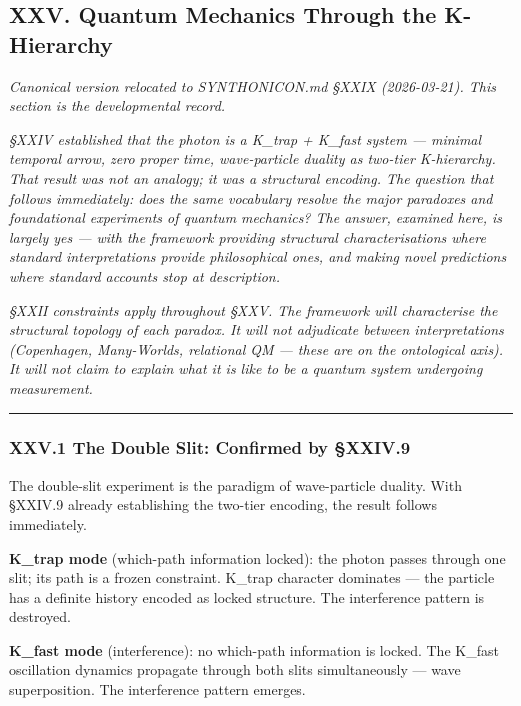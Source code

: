 \documentclass[12pt,a4paper]{article}
\begin{document}
\subsection{XXV. Quantum Mechanics Through the K-Hierarchy}

\emph{Canonical version relocated to SYNTHONICON.md §XXIX (2026-03-21). This section is the developmental record.}

\emph{§XXIV established that the photon is a K\_trap + K\_fast system --- minimal temporal arrow, zero proper time, wave-particle duality as two-tier K-hierarchy. That result was not an analogy; it was a structural encoding. The question that follows immediately: does the same vocabulary resolve the major paradoxes and foundational experiments of quantum mechanics? The answer, examined here, is largely yes --- with the framework providing structural characterisations where standard interpretations provide philosophical ones, and making novel predictions where standard accounts stop at description.}

\emph{§XXII constraints apply throughout §XXV. The framework will characterise the structural topology of each paradox. It will not adjudicate between interpretations (Copenhagen, Many-Worlds, relational QM --- these are on the ontological axis). It will not claim to explain what it is like to be a quantum system undergoing measurement.}

\begin{center}
\rule{0.5\textwidth}{0.4pt}
\end{center}

\subsubsection{XXV.1 The Double Slit: Confirmed by §XXIV.9}

The double-slit experiment is the paradigm of wave-particle duality. With §XXIV.9 already establishing the two-tier encoding, the result follows immediately.

\textbf{K\_trap mode} (which-path information locked): the photon passes through one slit; its path is a frozen constraint. K\_trap character dominates --- the particle has a definite history encoded as locked structure. The interference pattern is destroyed.

\textbf{K\_fast mode} (interference): no which-path information is locked. The K\_fast oscillation dynamics propagate through both slits simultaneously --- wave superposition. The interference pattern emerges.
\end{document}
